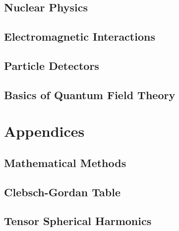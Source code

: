 \documentclass[a4paper, 11pt]{book}
\newcommand{\1}{\opr{\mathds{1}}}
\begin{document}
	\chapter{Nuclear Physics}
	
	\chapter{Electromagnetic Interactions}
	
	\chapter{Particle Detectors}
	
	\chapter{Basics of Quantum Field Theory}
	
%	
%	
%		
\part{Appendices}
\appendix
	\chapter{Mathematical Methods}
		
	\chapter{Clebsch-Gordan Table}\label{app:cgt}
		
	\chapter{Tensor Spherical Harmonics}\label{app:tsh}
		
\end{document}
